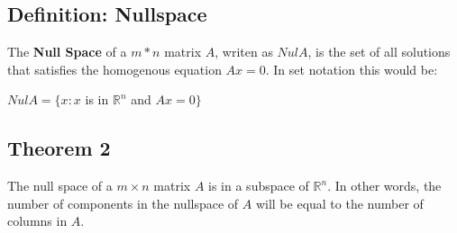 \documentclass{article}
\begin{document}
    \subsection*{Definition: Nullspace}
    The \textbf{Null Space} of a $m*n$ matrix $A$, writen as $Nul A$, is the set of all solutions that satisfies the homogenous equation $Ax=0$. In set notation this would be:
    \begin{center}
        $Nul A = \{x:x $ is in $\mathbb{R}^n$ and $Ax=0\}$
    \end{center}

    \subsection*{Theorem 2}
    The null space of a $m \times n$ matrix $A$ is in a subspace of $\mathbb{R}^n$. In other words, the number of components in the nullspace of $A$ will be equal to the number of columns in $A$.
\end{document}
